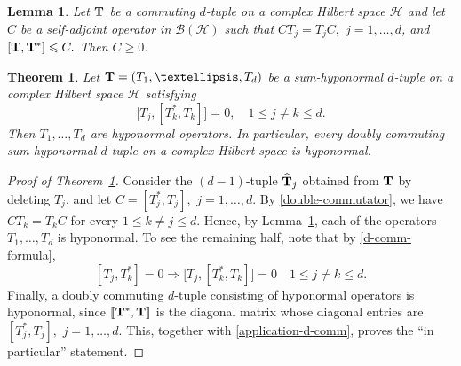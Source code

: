 \documentclass[10pt,a4paper]{amsart}
\newtheorem{theorem}{Theorem}
\newtheorem{lemma}{Lemma}
\newcommand*{\Ge}{\geqslant}
\newcommand*{\Le}{\leqslant}
\begin{document}
\begin{lemma} \label{gen-fact}
Let ${\bf T}$ be a commuting $d$-tuple on a complex Hilbert space $\mathcal H$ and 
let $C$ be a self-adjoint operator in $\mathcal B(\mathcal H)$ such that $CT_j=T_jC,$ $j=1, \ldots, d$, and $[{\bf T}, {\bf T}^*] \Le C.$ Then $C \Ge 0$.  
\end{lemma}

\begin{theorem} \label{main-3}
Let ${\bf T}=(T_1, \ldots, T_d)$ be a sum-hyponormal $d$-tuple on a complex Hilbert space $\mathcal H$ satisfying
\begin{equation}
\label{double-commutator}
\big[T_j, [T^*_k, T_k]\big] =0,  
\quad 1 \Le j \neq k \Le d.
\end{equation}
Then $T_1, \ldots, T_d$ are hyponormal operators. In particular, every doubly commuting sum-hyponormal $d$-tuple on a complex Hilbert space is hyponormal.
\end{theorem}

\begin{proof}[Proof of Theorem~\ref{main-3}] 	 
Consider the $(d-1)$-tuple $\widehat{\bf T}_j$ obtained from ${\bf T}$ by deleting $T_j$, and let $C=[T^*_j, T_j],$ $j=1, \ldots, d.$ By \eqref{double-commutator}, we have $CT_k = T_k C$ for every $1 \Le k \neq j \Le d$. Hence, by Lemma~\ref{gen-fact}, each of the operators $T_1, \ldots, T_d$ is hyponormal. To see the remaining half, note that by \eqref{d-comm-formula},
\begin{equation} \label{application-d-comm}
 [T_j, T^*_k]=0 \Longrightarrow \big[T_j, [T^*_k, T_k]\big] = 0
\quad 1 \Le j \neq k \Le d. 
\end{equation}
Finally, a doubly commuting $d$-tuple consisting of hyponormal operators is hyponormal, since $[\![{\bf T}^*, {\bf T}]\!]$ is the diagonal matrix whose diagonal entries are $[T^*_j, T_j],$ $j=1, \ldots, d$. This, together with \eqref{application-d-comm}, 
proves the ``in particular” statement.
\end{proof}
\end{document}
